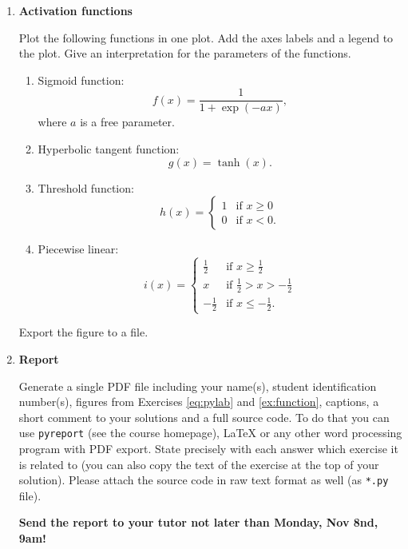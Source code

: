 \documentclass[12pt, a4]{article}
\begin{document}
\begin{enumerate}
\item \textbf{Activation functions}
    \label{ex:function}
    
    Plot the following functions in one plot. Add the axes labels and
    a legend to the plot. Give an interpretation for the parameters of
    the functions.

    \begin{enumerate}
        \item Sigmoid function:
            $$f(x)=\frac{1}{1+\exp(-ax)},$$ 
            where $a$ is a free parameter.
        \item Hyperbolic tangent function:
            $$g(x)=\tanh(x).$$
        \item Threshold function:
            \begin{equation*}
                h(x)=\begin{cases}1 & \text{if $x\geq0$} \\
                                  0 & \text{if $x<0$.}
                    \end{cases}
            \end{equation*}
        \item Piecewise linear:
            \begin{equation*}
                i(x)=\begin{cases} \frac{1}{2}& \text{if $x\geq\frac{1}{2}$} \\
                    x & \text{if $\frac{1}{2}>x>-\frac{1}{2}$} \\
                    -\frac{1}{2} & \text{if $x\leq-\frac{1}{2}$.}
                    \end{cases}
            \end{equation*}

    \end{enumerate}

    Export the figure to a file.

\item \textbf {Report}

    Generate a single PDF file including your name(s), student
    identification number(s), figures from Exercises \ref{eq:pylab} and
    \ref{ex:function}, captions, a short comment to your solutions and
    a full source code. To do that you can use  \texttt{pyreport} (see the
    course homepage), LaTeX or any other word processing program with
    PDF export. State precisely with each answer which exercise it is
    related to (you can also copy the text of the exercise at the top
    of your solution). Please attach the source code in raw text
    format as well (as \texttt{*.py} file).
    
    \textbf{Send the report to your tutor not later
    than Monday, Nov 8nd, 9am!} \end{enumerate}
\end{document}
